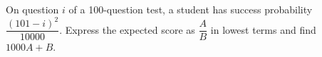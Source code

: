 On question $i$ of a 100-question test, a student has success probability $\dfrac{(101-i)^2}{10000}$. Express the expected score as $\dfrac{A}{B}$ in lowest terms and find $1000A+B$.
